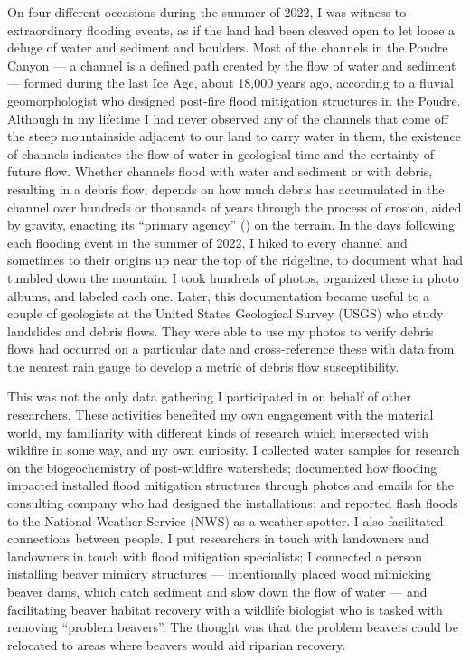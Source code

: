 \documentclass[
]{article}
\begin{document}
On four different occasions during the summer of 2022, I was witness to extraordinary flooding events, as if the land had been cleaved open to let loose a deluge of water and sediment and boulders. Most of the channels in the Poudre Canyon --- a channel is a defined path created by the flow of water and sediment --- formed during the last Ice Age, about 18,000 years ago, according to a fluvial geomorphologist who designed post-fire flood mitigation structures in the Poudre. Although in my lifetime I had never observed any of the channels that come off the steep mountainside adjacent to our land to carry water in them, the existence of channels indicates the flow of water in geological time and the certainty of future flow. Whether channels flood with water and sediment or with debris, resulting in a debris flow, depends on how much debris has accumulated in the channel over hundreds or thousands of years through the process of erosion, aided by gravity, enacting its ``primary agency'' () on the terrain. In the days following each flooding event in the summer of 2022, I hiked to every channel and sometimes to their origins up near the top of the ridgeline, to document what had tumbled down the mountain. I took hundreds of photos, organized these in photo albums, and labeled each one. Later, this documentation became useful to a couple of geologists at the United States Geological Survey (USGS) who study landslides and debris flows. They were able to use my photos to verify debris flows had occurred on a particular date and cross-reference these with data from the nearest rain gauge to develop a metric of debris flow susceptibility.

This was not the only data gathering I participated in on behalf of other researchers. These activities benefited my own engagement with the material world, my familiarity with different kinds of research which intersected with wildfire in some way, and my own curiosity. I collected water samples for research on the biogeochemistry of post-wildfire watersheds; documented how flooding impacted installed flood mitigation structures through photos and emails for the consulting company who had designed the installations; and reported flash floods to the National Weather Service (NWS) as a weather spotter. I also facilitated connections between people. I put researchers in touch with landowners and landowners in touch with flood mitigation specialists; I connected a person installing beaver mimicry structures --- intentionally placed wood mimicking beaver dams, which catch sediment and slow down the flow of water --- and facilitating beaver habitat recovery with a wildlife biologist who is tasked with removing ``problem beavers''. The thought was that the problem beavers could be relocated to areas where beavers would aid riparian recovery.
\end{document}
